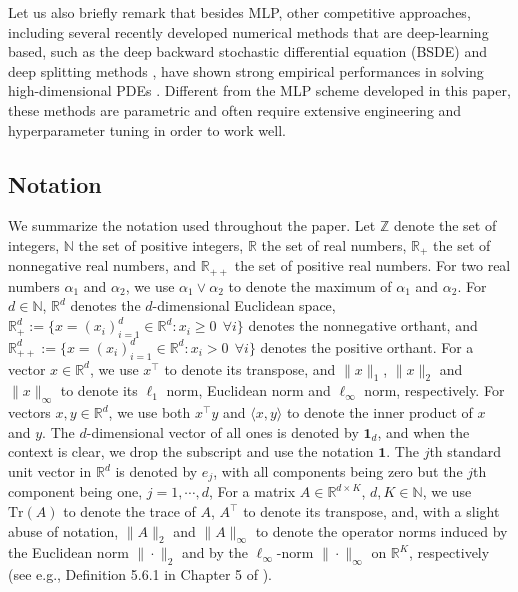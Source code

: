\documentclass[11pt]{article}
\theoremstyle{definition}
\theoremstyle{plain}
\newcommand{\R}{\mathbb{R}}
\newcommand{\N}{\mathbb{N}}
\newcommand{\bOne}{\bm{1}}
\newcommand{\Z}{\mathbb{Z}}
\newcommand{\tr}{\text{Tr}}
\begin{document}
Let us also briefly remark that besides MLP, other competitive approaches, 
including several recently developed numerical methods that are deep-learning based, such as the deep backward stochastic differential equation (BSDE) \cite{HanJentzenE2018PNAS} and deep splitting methods \cite{BeckJentzen2019}, 
have shown strong empirical performances in solving high-dimensional PDEs \cite{HanJentzenE2018PNAS,BeckJentzen2019,HurePhamWarin2020,WeinanHanJentzen2021,AtaHarrisonSi2024,ata2025analysis,AtaKasikaralar2023}. 
Different from the MLP scheme developed in this paper, these methods are parametric and often require extensive engineering and hyperparameter tuning in order to work well. 

\subsection{Notation}\label{ssec:notation}
We summarize the notation used throughout the paper.
Let $\Z$ denote the set of integers, $\N$ the set of positive integers, 
$\R$ the set of real numbers, $\R_+$ the set of nonnegative real numbers, 
and $\R_{++}$ the set of positive real numbers. 
For two real numbers $\alpha_1$ and $\alpha_2$, we use $\alpha_1 \vee \alpha_2$ to denote the maximum of $\alpha_1$ and $\alpha_2$.
For $d \in \N$, $\R^d$ denotes the $d$-dimensional Euclidean space, 
$\R_+^d := \{x = (x_i)_{i=1}^d \in \R^d: x_i \geq 0 ~~\forall i\}$ denotes the nonnegative orthant, 
and $\R_{++}^d := \{x = (x_i)_{i=1}^d \in \R^d: x_i > 0 ~~\forall i\}$ denotes the positive orthant. 
For a vector $x \in \R^d$, we use $x^{\top}$ to denote its transpose, 
and $\|x\|_1$, $\|x\|_2$ and $\|x\|_\infty$ to denote its $\ell_1$ norm, Euclidean norm and $\ell_\infty$ norm, respectively. 
For vectors $x, y \in \R^d$, we use both $x^\top y$ and $\langle x, y \rangle$ to denote the inner product of $x$ and $y$. 
The $d$-dimensional vector of all ones is denoted by $\bOne_d$, and when the context is clear, we drop the subscript and use the notation $\bOne$. 
The $j$th standard unit vector in $\R^d$ is denoted by $e_j$, with all components being zero but the $j$th component being one, $j=1, \cdots, d$, 
For a matrix $A \in \R^{d\times K}$, $d, K \in \N$, we use $\tr(A)$ to denote the trace of $A$, 
$A^{\top}$ to denote its transpose, and, with a slight abuse of notation,
$\|A\|_2$ and $\|A\|_\infty$ to denote the operator norms induced by the Euclidean norm $\|\cdot\|_2$ 
and by the $\ell_\infty$-norm $\|\cdot\|_\infty$ on $\R^K$, respectively 
(see e.g., Definition 5.6.1 in Chapter 5 of \cite{HornJohnson2012}).
\end{document}
